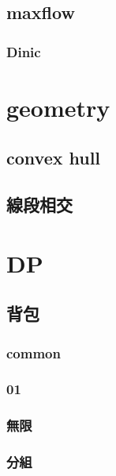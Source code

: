 \subsection{maxflow}
\subsubsection{Dinic}


\section{geometry}
\subsection{convex hull}


\subsection{線段相交}


\section{DP}

\subsection{背包}

\subsubsection{common}


\subsubsection{01}


\subsubsection{無限}


\subsubsection{分組}


